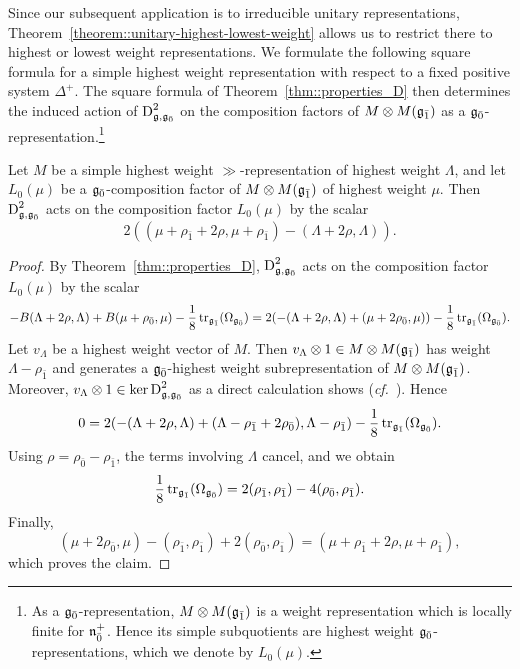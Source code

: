 Since our subsequent application is to irreducible unitary representations, Theorem~\ref{theorem::unitary-highest-lowest-weight} allows us to restrict there to highest or lowest weight representations. We formulate the following square formula for a simple highest weight representation with respect to a fixed positive system $\Delta^{+}$. The square formula of Theorem~\ref{thm::properties_D} then determines the induced action of $\operatorname{D}_{{\mathfrak{g}},{\mathfrak{g}_{\bar{0}}}}^{2}$ on the composition factors of $M\otimes M({\mathfrak{g}_{\bar{1}}})$ as a ${\mathfrak{g}_{\bar{0}}}$-representation.\footnote{As a ${\mathfrak{g}_{\bar{0}}}$-representation, $M\otimes M({\mathfrak{g}_{\bar{1}}})$ is a weight representation which is locally finite for ${\mathfrak{n}}_{\bar{0}}^{+}$. Hence its simple subquotients are highest weight ${\mathfrak{g}_{\bar{0}}}$-representations, which we denote by $L_0(\mu)$.} 

\begin{theorem}\label{thm::dirac-square-action}
Let $M$ be a simple highest weight $\gg$-representation of highest weight $\Lambda$, and let $L_{0}(\mu)$ be a ${\mathfrak{g}_{\bar{0}}}$-composition factor of $M\otimes M({\mathfrak{g}_{\bar{1}}})$ of highest weight $\mu$. Then $\operatorname{D}_{{\mathfrak{g}},{\mathfrak{g}_{\bar{0}}}}^{2}$ acts on the composition factor $L_{0}(\mu)$ by the scalar
\begin{equation*}
2((\mu+\rho_{\bar{1}}+2\rho,\mu+\rho_{\bar{1}})-(\Lambda+2\rho,\Lambda)).
\end{equation*}
\end{theorem}
\begin{proof}
By Theorem~\ref{thm::properties_D}, $\operatorname{D}_{{\mathfrak{g}},{\mathfrak{g}_{\bar{0}}}}^{2}$ acts on the composition factor $L_0(\mu)$ by the scalar
\begin{equation*}
-B(\Lambda+2\rho,\Lambda)+B(\mu+\rho_{\bar{0}},\mu)-\frac{1}{8}\operatorname{tr}_{{\mathfrak{g}_{\bar{1}}}}(\Omega_{{\mathfrak{g}_{\bar{0}}}})=2(-(\Lambda+2\rho,\Lambda)+(\mu+2\rho_{\bar0},\mu))-\frac18\operatorname{tr}_{{\mathfrak{g}_{\bar{1}}}}(\Omega_{{\mathfrak{g}_{\bar{0}}}}).
\end{equation*}
Let $v_{\Lambda}$ be a highest weight vector of $M$. Then $v_{\Lambda}\otimes 1\in M\otimes M({\mathfrak{g}_{\bar{1}}})$ has weight $\Lambda-\rho_{\bar1}$ and generates a ${\mathfrak{g}_{\bar{0}}}$-highest weight subrepresentation of $M\otimes M({\mathfrak{g}_{\bar{1}}})$. Moreover, $v_{\Lambda}\otimes1\in\ker\operatorname{D}_{{\mathfrak{g}},{\mathfrak{g}_{\bar{0}}}}^{2}$ as a direct calculation shows (\emph{cf.}~\cite{SchmidtDirac}). Hence
\begin{equation*}
0
=
2(-(\Lambda+2\rho,\Lambda)
+
(\Lambda-\rho_{\bar1}+2\rho_{\bar0}),\Lambda-\rho_{\bar1})
-
\frac18\operatorname{tr}_{{\mathfrak{g}_{\bar{1}}}}(\Omega_{{\mathfrak{g}_{\bar{0}}}}).
\end{equation*}
Using $\rho=\rho_{\bar0}-\rho_{\bar1}$, the terms involving $\Lambda$ cancel, and we obtain
\begin{equation*}
\frac18\operatorname{tr}_{{\mathfrak{g}_{\bar{1}}}}(\Omega_{{\mathfrak{g}_{\bar{0}}}})
=
2(\rho_{\bar1},\rho_{\bar1})
-
4(\rho_{\bar0},\rho_{\bar1}).
\end{equation*}
Finally,
\begin{equation*}
(\mu+2\rho_{\bar0},\mu)
-
(\rho_{\bar1},\rho_{\bar1})
+
2(\rho_{\bar0},\rho_{\bar1})
=
(\mu+\rho_{\bar1}+2\rho,\mu+\rho_{\bar1}),
\end{equation*}
which proves the claim.
\end{proof}

